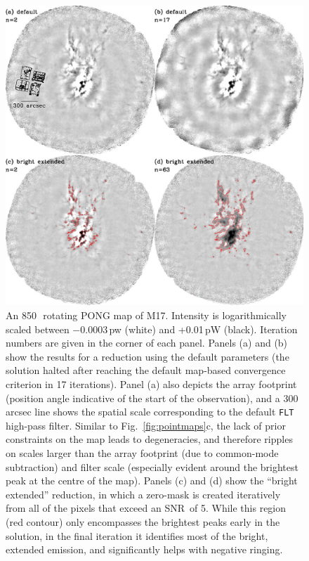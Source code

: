 \documentclass[useAMS,usenatbib,nofootinbib]{mn2e}
\newcommand{\snr}{SNR}
\newcommand{\model}[1]{\texttt{#1}}
\begin{document}
\begin{figure}
\centering
\includegraphics[width=\linewidth]{m17}
\caption{An 850\,\micron\ rotating PONG map of M17. Intensity is
logarithmically scaled between $-$0.0003\,pw (white) and +0.01\,pW
(black). Iteration numbers are given in the corner of each
panel. Panels (a) and (b) show the results for a reduction using the
default parameters (the solution halted after reaching the default
map-based convergence criterion in 17 iterations). Panel (a) also
depicts the array footprint (position angle indicative of the start of
the observation), and a 300\,arcsec line shows the spatial scale
corresponding to the default \model{FLT} high-pass filter. Similar to
Fig.~\ref{fig:pointmaps}c, the lack of prior constraints on the map
leads to degeneracies, and therefore ripples on scales larger than the
array footprint (due to common-mode subtraction) and filter scale
(especially evident around the brightest peak at the centre of the
map). Panels (c) and (d) show the ``bright extended'' reduction, in
which a zero-mask is created iteratively from all of the pixels that
exceed an \snr\ of 5. While this region (red contour) only encompasses
the brightest peaks early in the solution, in the final iteration it
identifies most of the bright, extended emission, and significantly
helps with negative ringing.}
\label{fig:m17}
\end{figure}
\end{document}
